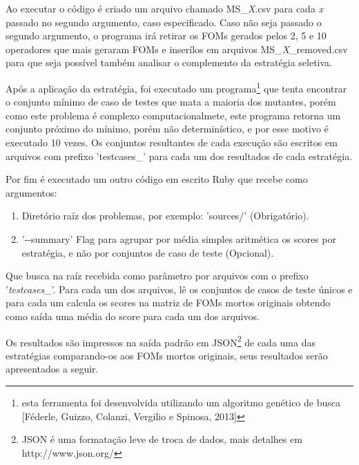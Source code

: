 Ao executar o código é criado um arquivo chamado MS\_\textit{X}.csv para cada 
\textit{x} passado no segundo argumento, caso especificado. Caso não seja 
passado o segundo argumento, o programa irá retirar os FOMs gerados 
pelos 2, 5 e 10 operadores que mais geraram FOMs e inserílos em arquivos
 MS\_\textit{X}\_removed.csv para que seja possível também analisar o 
complemento da estratégia seletiva.

Após a aplicação da estratégia, foi executado um programa\footnote{esta 
ferramenta foi desenvolvida utilizando um algoritmo genético de busca
[Féderle, Guizzo, Colanzi, Vergilio e Spinosa, 2013]} que tenta encontrar
o conjunto mínimo de caso de testes que mata a maioria dos mutantes, porém 
como este problema é complexo computacionalmete, este programa retorna um 
conjunto próximo do mínimo, porém não determinístico, e por esse motivo é
executado 10 vezes. Os conjuntos resultantes de cada execução são escritos
em arquivos com prefixo 'testcases\_' para cada um dos resultados de cada
estratégia.

Por fim é executado um outro código em escrito Ruby que recebe como 
argumentos:
\begin{enumerate}
\item Diretório raíz dos problemas, por exemplo: 'sources/' (Obrigatório).
\item '-\--summary' Flag para agrupar por média simples aritmética os scores
por estratégia, e não por conjuntos de caso de teste (Opcional).
\end{enumerate}
Que busca na raíz recebida como parâmetro por arquivos com o prefixo 
'\textit{testcases\_}'. Para cada um dos arquivos, lê os conjuntos de 
casos de teste únicos e para cada um calcula os scores na matriz de FOMs
mortos originais obtendo como saída uma média do score para cada um 
dos arquivos.

Os resultados são impressos na saída padrão em JSON\footnote{JSON é uma
formatação leve de troca de dados, mais detalhes em http://www.json.org/}
de cada uma das estratégias comparando-os aos FOMs mortos originais, 
seus resultados serão apresentados a seguir.